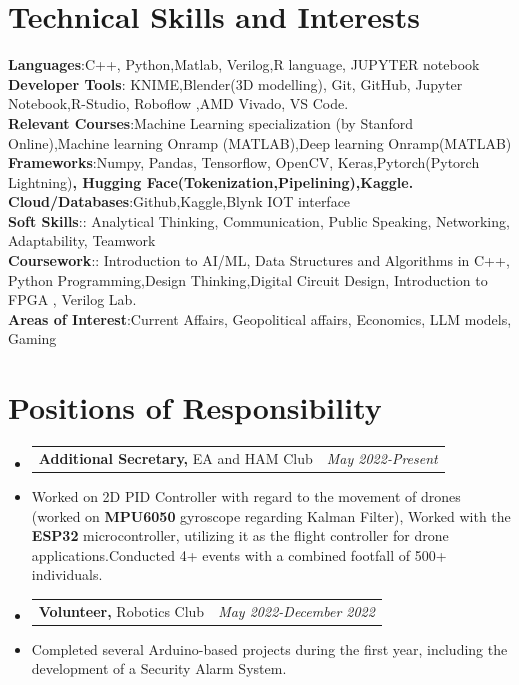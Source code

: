 \documentclass[a4paper,11pt]{article}
\makeatletter
\newcommand{\resumePOR}[3]{
\vspace{0.5mm}\item
    \begin{tabular*}{0.97\textwidth}[t]{l@{\extracolsep{\fill}}r}
        \textbf{#1}\hspace{0.3mm}#2 & \textit{\small{#3}} 
    \end{tabular*}
    \vspace{-2mm}
}
\newcommand{\resumeSubHeadingListStart}{\begin{itemize}[leftmargin=*,labelsep=0mm]}
\newcommand{\resumeSubHeadingListEnd}{\end{itemize}\vspace{2mm}}
\makeatother
\begin{document}
\section{\textbf{Technical Skills and Interests}}
 \begin{itemize}[leftmargin=0.05in, label={}]
    \small{\item{
     \textbf{Languages}{:C++, Python,Matlab, Verilog,R language, JUPYTER notebook} \\
     \textbf{Developer Tools}{: KNIME,Blender(3D modelling), Git, GitHub, Jupyter Notebook,R-Studio, Roboflow ,AMD Vivado, VS Code. } \\
     \textbf{Relevant Courses}{:Machine Learning specialization (by Stanford Online),Machine learning Onramp (MATLAB),Deep learning Onramp(MATLAB)}\\
     \textbf{Frameworks}{:Numpy, Pandas, Tensorflow, OpenCV, Keras,}Pytorch(Pytorch Lightning)\textbf{, Hugging Face(Tokenization,Pipelining),Kaggle. } \\
     \textbf{Cloud/Databases}{:Github,Kaggle,Blynk IOT interface } \\
     \textbf{Soft Skills}{:: Analytical Thinking, Communication, Public Speaking, Networking, Adaptability, Teamwork } \\
     \textbf{Coursework}{:: Introduction to AI/ML, Data Structures and Algorithms in C++, Python Programming,Design Thinking,Digital Circuit Design, Introduction to FPGA , Verilog Lab. } \\
     \textbf{Areas of Interest}{:Current Affairs, Geopolitical affairs, Economics, LLM models, Gaming } \\
    }}
 \end{itemize}
 \vspace{-16pt}



\section{\textbf{Positions of Responsibility}}
\vspace{-0.4mm}
\resumeSubHeadingListStart
    \resumePOR{Additional Secretary, }{EA and HAM Club}{May 2022-Present} %
    \item {Worked on 2D PID Controller with regard to the movement of drones (worked on \textbf{MPU6050} gyroscope regarding Kalman Filter), Worked with the\textbf{ ESP32} microcontroller, utilizing it as the flight controller for drone applications.Conducted 4+ events with a combined footfall of 500+ individuals. } 
    \resumePOR{Volunteer, }{Robotics Club}{May 2022-December 2022} %
    \item {Completed several Arduino-based projects during the first year, including the development of a Security Alarm System.}
\resumeSubHeadingListEnd
\vspace{-5mm}
\end{document}
